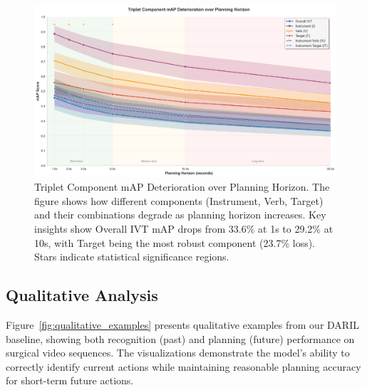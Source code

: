 \documentclass[runningheads]{llncs}
\begin{document}
\begin{figure}[h]
\centering
\includegraphics[width=\textwidth]{planning_analysis_simple.png}
\caption{Triplet Component mAP Deterioration over Planning Horizon. The figure shows how different components (Instrument, Verb, Target) and their combinations degrade as planning horizon increases. Key insights show Overall IVT mAP drops from 33.6\% at 1s to 29.2\% at 10s, with Target being the most robust component (23.7\% loss). Stars indicate statistical significance regions.}
\label{fig:planning_analysis}
\end{figure}

\subsection{Qualitative Analysis}

Figure~\ref{fig:qualitative_examples} presents qualitative examples from our DARIL baseline, showing both recognition (past) and planning (future) performance on surgical video sequences. The visualizations demonstrate the model's ability to correctly identify current actions while maintaining reasonable planning accuracy for short-term future actions.
\end{document}
